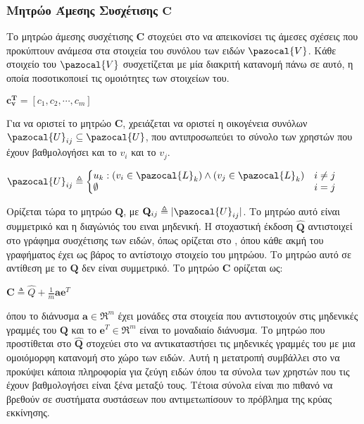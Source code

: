 \subsubsection{Μητρώο Άμεσης Συσχέτισης $\mathbf{C}$}
Το μητρώο άμεσης συσχέτισης $\mathbf{C}$ στοχεύει στο να απεικονίσει τις άμεσες σχέσεις που προκύπτουν ανάμεσα στα στοιχεία του συνόλου των ειδών $\pazocal{V}$. Κάθε στοιχείο του $\pazocal{V}$ συσχετίζεται με μία διακριτή κατανομή πάνω σε αυτό, η οποία ποσοτικοποιεί τις ομοιότητες των στοιχείων του. 
\begin{center}
$\mathbf{c_\mathbf{v}^T} = [c_1, c_2, \cdots, c_m]$
\end{center}
Για να οριστεί το μητρώο $\mathbf{C}$, χρειάζεται να οριστεί η οικογένεια συνόλων $\pazocal{U}_{ij} \subseteq \pazocal{U}$, που αντιπροσωπεύει το σύνολο των χρηστών που έχουν βαθμολογήσει και το $v_i$ και το $v_j$. 
\begin{center}
$\pazocal{U}_{ij} \triangleq \left\{
    \begin{array}{@{} l c @{}}
      u_k : (v_i \in \pazocal{L}_k) \wedge (v_j \in \pazocal{L}_k) & i \neq j \\
      \emptyset & i = j
    \end{array}\right.$
\end{center}
Ορίζεται τώρα το μητρώο $\mathbf{Q}$, με $\mathbf{Q}_{ij} \triangleq |\pazocal{U}_{ij}|$. Το μητρώο αυτό είναι συμμετρικό και η διαγώνιός του ειναι μηδενική. Η στοχαστική έκδοση $\mathbf{\hat{Q}}$ αντιστοιχεί στο γράφημα συσχέτισης των ειδών, όπως ορίζεται στο \cite{Gori:2007:IRB:1625275.1625720}, όπου κάθε ακμή του γραφήματος έχει ως βάρος το αντίστοιχο στοιχείο του μητρώου. Το μητρώο αυτό σε αντίθεση με το $\mathbf{Q}$ δεν είναι συμμετρικό. Το μητρώο $\mathbf{C}$ ορίζεται ως:
\begin{center}
$\mathbf{C} \triangleq \hat{Q} + \frac{1}{m}\mathbf{a}\mathbf{e}^T$
\end{center}
όπου το διάνυσμα $\mathbf{a} \in \Re^m$ έχει μονάδες στα στοιχεία που αντιστοιχούν στις μηδενικές γραμμές του $\mathbf{Q}$ και το $\mathbf{e}^T \in \Re^m$ είναι το μοναδιαίο διάνυσμα. Το μητρώο που προστίθεται στο $\mathbf{\hat{Q}}$ στοχεύει στο να αντικαταστήσει τις μηδενικές γραμμές του με μια ομοιόμορφη κατανομή στο χώρο των ειδών. Αυτή η μετατροπή συμβάλλει στο να προκύψει κάποια πληροφορία για ζεύγη ειδών όπου τα σύνολα των χρηστών που τις έχουν βαθμολογήσει είναι ξένα μεταξύ τους. Τέτοια σύνολα είναι πιο πιθανό να βρεθούν σε συστήματα συστάσεων που αντιμετωπίσουν το πρόβλημα της κρύας εκκίνησης. 
